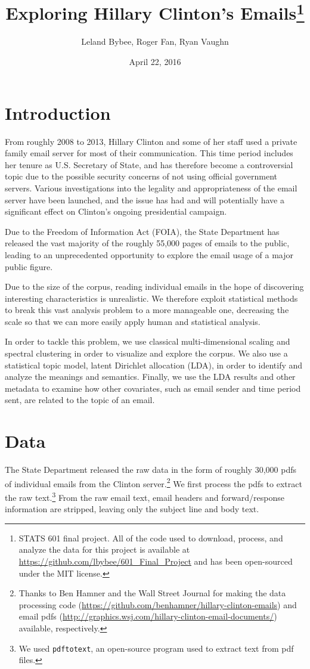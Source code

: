 \documentclass[12pt]{article}
\theoremstyle{definition}
\theoremstyle{algodesc}
\begin{document}
\title{Exploring Hillary Clinton's Emails\thanks{STATS 601 final project. All of the code used to download, process, and analyze the data for this project is available at \url{https://github.com/lbybee/601_Final_Project} and has been open-sourced under the MIT license.}}
\author{
    Leland Bybee, Roger Fan, Ryan Vaughn
}
\date{April 22, 2016}

\maketitle


\section{Introduction}
From roughly 2008 to 2013, Hillary Clinton and some of her staff used a private family email server for most of their communication. This time period includes her tenure as U.S. Secretary of State, and has therefore become a controversial topic due to the possible security concerns of not using official government servers. Various investigations into the legality and appropriateness of the email server have been launched, and the issue has had and will potentially have a significant effect on Clinton's ongoing presidential campaign.

Due to the Freedom of Information Act (FOIA), the State Department has released the vast majority of the roughly 55,000 pages of emails to the public, leading to an unprecedented opportunity to explore the email usage of a major public figure.

Due to the size of the corpus, reading individual emails in the hope of discovering interesting characteristics is unrealistic. We therefore exploit statistical methods to break this vast analysis problem to a more manageable one, decreasing the scale so that we can more easily apply human and statistical analysis.

In order to tackle this problem, we use classical multi-dimensional scaling and spectral clustering in order to visualize and explore the corpus. We also use a statistical topic model, latent Dirichlet allocation (LDA), in order to identify and analyze the meanings and semantics. Finally, we use the LDA results and other metadata to examine how other covariates, such as email sender and time period sent, are related to the topic of an email.


\section{Data}
The State Department released the raw data in the form of roughly 30,000 pdfs of individual emails from the Clinton server.\footnote{Thanks to Ben Hamner and the Wall Street Journal for making the data processing code (\url{https://github.com/benhamner/hillary-clinton-emails}) and email pdfs (\url{http://graphics.wsj.com/hillary-clinton-email-documents/}) available, respectively.} We first process the pdfs to extract the raw text.\footnote{We used \texttt{pdftotext}, an open-source program used to extract text from pdf files.} From the raw email text, email headers and forward/response information are stripped, leaving only the subject line and body text.
\end{document}

